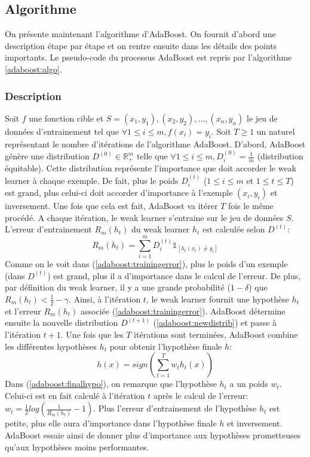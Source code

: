 \documentclass[12pt]{article}
\begin{document}
	\subsection{Algorithme}
	
	On présente maintenant l'algorithme d'AdaBoost. On fournit d'abord une description étape par étape et on rentre ensuite dans les détails des points importants. Le pseudo-code du processus AdaBoost est repris par l'algorithme \ref{adaboost:algo}.
	
	\subsubsection{Description}
	
	Soit $f$ une fonction cible et $S=(x_1,y_1),(x_2,y_2),...,(x_n,y_n)$ le jeu de données d'entrainement
	tel que $\forall 1 \leq i \leq m, f(x_i) = y_i$. Soit $T \geq 1$ un naturel représentant le nombre
	d'itérations de l'algorithme AdaBoost. D'abord, AdaBoost génère une distribution $D^{(0)} \in \mathbb{R}^m_+$
	telle que $\forall 1 \leq i \leq m, D^{(0)}_i = \frac{1}{m}$ (distribution équitable).
	Cette distribution représente l'importance que doit accorder le weak learner à chaque exemple.
	De fait, plus le poids $D^{(t)}_i$ ($1 \leq i \leq m$ et $1 \leq t \leq T$) est grand, plus
	celui-ci doit accorder d'importance à l'exemple $(x_i,y_i)$ et inversement. Une fois que cela
	est fait, AdaBoost va itérer $T$ fois le même procédé. A chaque itération, le weak learner
	s'entraine sur le jeu de données $S$. L'erreur d'entrainement $R_m(h_t)$ du weak learner $h_t$ est
	calculée selon $D^{(t)}$:
	\begin{equation}
		\label{adaboost:trainingerror}
		R_m(h_t) = \sum_{i=1}^m D^{(t)}_i \mathbb{1}_{[h_t(x_i) \neq y_i]}
	\end{equation}
	Comme on le voit dans (\ref{adaboost:trainingerror}), plus le poids d'un exemple (dans $D^{(t)}$) est grand, plus il a d'importance dans le calcul de l'erreur. De plus, par définition du weak learner, il y a une grande probabilité ($1- \delta$) que $R_m(h_t)< \frac{1}{2} - \gamma$. Ainsi, à l'itération $t$, le weak learner fournit une hypothèse $h_t$ et l'erreur $R_m(h_t)$ associée (\ref{adaboost:trainingerror}). AdaBoost détermine ensuite la nouvelle distribution $D^{(t+1)}$ (\ref{adaboost:newdistrib}) et passe à l'itération $t+1$. Une fois que les $T$ itérations sont terminées, AdaBoost combine les différentes hypothèses $h_t$ pour obtenir l'hypothèse finale $h$:
	\begin{equation}
		\label{adaboost:finalhypo}
		h(x) = sign (\sum_{t=1}^T w_t h_t(x))
	\end{equation}
	Dans (\ref{adaboost:finalhypo}), on remarque que l'hypothèse $h_t$ a un poids $w_t$.
	Celui-ci est en fait calculé à l'itération $t$ après le calcul de l'erreur:
	$w_t = \frac{1}{2} log(\frac{1}{R_m(h_t)} - 1)$. Plus l'erreur d'entrainement de l'hypothèse $h_t$
	est petite, plus elle aura d'importance dans l'hypothèse finale $h$ et inversement.
	AdaBoost essaie ainsi de donner plus d'importance aux hypothèses prometteuses qu'aux hypothèses
	moins performantes.
	
\end{document}
